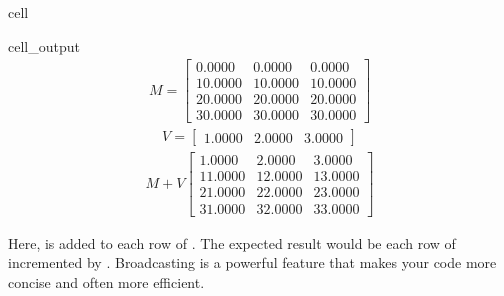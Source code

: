 \documentclass[letterpaper,10pt,english]{jupyterBook}
\begin{document}
\begin{sphinxuseclass}{cell}
\begin{sphinxVerbatimOutput}
\begin{sphinxuseclass}{cell_output}\begin{equation*}
\begin{split}\displaystyle M=\left[
\begin{array}{}
  0.0000 &  0.0000 &  0.0000\\
  10.0000 &  10.0000 &  10.0000\\
  20.0000 &  20.0000 &  20.0000\\
  30.0000 &  30.0000 &  30.0000
\end{array}
\right]\end{split}
\end{equation*}\begin{equation*}
\begin{split}\displaystyle V=\left[
\begin{array}{}
  1.0000 &  2.0000 &  3.0000
\end{array}
\right]\end{split}
\end{equation*}\begin{equation*}
\begin{split}\displaystyle M+V\left[
\begin{array}{}
  1.0000 &  2.0000 &  3.0000\\
  11.0000 &  12.0000 &  13.0000\\
  21.0000 &  22.0000 &  23.0000\\
  31.0000 &  32.0000 &  33.0000
\end{array}
\right]\end{split}
\end{equation*}
\end{sphinxuseclass}\end{sphinxVerbatimOutput}

\end{sphinxuseclass}
\sphinxAtStartPar
Here,  is added to each row of . The expected result would be each row of  incremented by \sphinxcode{\sphinxupquote{{[}1, 2, 3{]}}}. Broadcasting is a powerful feature that makes your code more concise and often more efficient.
\end{document}

